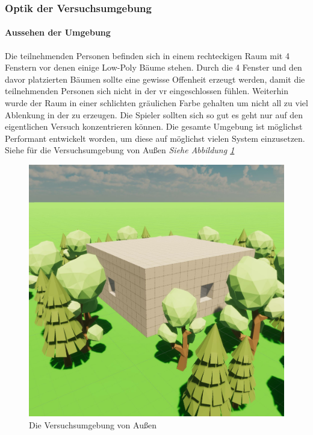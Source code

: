 \documentclass[a4paper,11pt]{article}%
\renewcommand{\\}{\vspace*{0.5\baselineskip} \newline}
\begin{document}
\subsubsection{Optik der Versuchsumgebung}
\paragraph{Aussehen der Umgebung}
Die teilnehmenden Personen befinden sich in einem rechteckigen Raum mit 4 Fenstern vor denen einige Low-Poly Bäume stehen. Durch die 4 Fenster und den davor platzierten Bäumen sollte eine gewisse Offenheit erzeugt werden, damit die teilnehmenden Personen sich nicht in der \ac{vr} eingeschlossen fühlen. Weiterhin wurde der Raum in einer schlichten gräulichen Farbe gehalten um nicht all zu viel Ablenkung in der zu erzeugen. Die Spieler sollten sich so gut es geht nur auf den eigentlichen Versuch konzentrieren können. Die gesamte Umgebung ist möglichst Performant entwickelt worden, um diese auf möglichst vielen System einzusetzen. Siehe für die Versuchsumgebung von Außen \textit{Siehe Abbildung \ref{Versuchsumgebung}} 

\begin{figure}[H]
		\begin{footnotesize}
		\centering
			\includegraphics[scale=0.4]{Abbildungen/Versuchsumgebung/Raum.JPG}
			
			\caption[Abbildung 1]{Die Versuchsumgebung von Außen}
			\label{Versuchsumgebung}
		\end{footnotesize}
	\end{figure}
\end{document}
